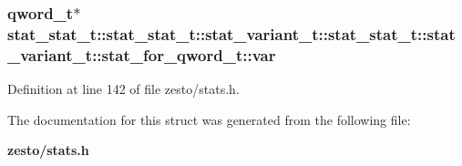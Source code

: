 \subsubsection[{var}]{\setlength{\rightskip}{0pt plus 5cm}qword\_\-t$\ast$ stat\_\-stat\_\-t::stat\_\-stat\_\-t::stat\_\-variant\_\-t::stat\_\-stat\_\-t::stat\_\-variant\_\-t::stat\_\-for\_\-qword\_\-t::var}\label{structstat__stat__t_1_1stat__variant__t_1_1stat__for__qword__t_3a4e4766ee7b011374e1f6b639835949}




Definition at line 142 of file zesto/stats.h.

The documentation for this struct was generated from the following file:\begin{CompactItemize}
\item 
{\bf zesto/stats.h}\end{CompactItemize}

